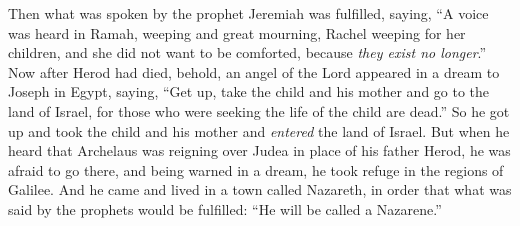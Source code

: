 \begin{biblechapter}
\verse Then what was spoken by the prophet Jeremiah was fulfilled, saying,
\verse “A voice was heard in Ramah, 
weeping and great mourning, 
Rachel weeping for her children, 
and she did not want to be comforted, 
because \textit{they exist no longer}.”
 Now after Herod had died, behold, an angel of the Lord appeared in a dream to Joseph in Egypt,
\verse saying, “Get up, take the child and his mother and go to the land of Israel, for those who were seeking the life of the child are dead.”
\verse So he got up and took the child and his mother and \textit{entered} the land of Israel.
\verse But when he heard that Archelaus was reigning over Judea in place of his father Herod, he was afraid to go there, and being warned in a dream, he took refuge in the regions of Galilee.
\verse And he came and lived in a town called Nazareth, in order that what was said by the prophets would be fulfilled: “He will be called a Nazarene.”
\end{biblechapter}

